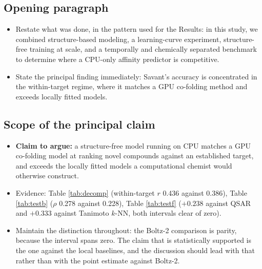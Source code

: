\documentclass[11pt]{article}
\begin{document}
\subsection*{Opening paragraph}
\begin{itemize}
  \item Restate what was done, in the pattern used for the Results: in this
        study, we combined structure-based modeling, a learning-curve
        experiment, structure-free training at scale, and a temporally and
        chemically separated benchmark to determine where a CPU-only affinity
        predictor is competitive.
  \item State the principal finding immediately: Savant's accuracy is
        concentrated in the within-target regime, where it matches a GPU
        co-folding method and exceeds locally fitted models.
\end{itemize}

\subsection*{Scope of the principal claim}
\begin{itemize}
  \item \textbf{Claim to argue:} a structure-free model running on CPU matches
        a GPU co-folding model at ranking novel compounds against an
        established target, and exceeds the locally fitted models a
        computational chemist would otherwise construct.
  \item Evidence: Table \ref{tab:decomp} (within-target $r$ 0.436 against
        0.386), Table \ref{tab:testb} ($\rho$ 0.278 against 0.228), Table
        \ref{tab:testf} ($+0.238$ against QSAR and $+0.333$ against Tanimoto
        $k$-NN, both intervals clear of zero).
  \item Maintain the distinction throughout: the Boltz-2 comparison is parity,
        because the interval spans zero. The claim that is statistically
        supported is the one against the local baselines, and the discussion
        should lead with that rather than with the point estimate against
        Boltz-2.
\end{itemize}
\end{document}

